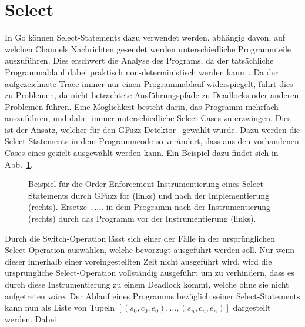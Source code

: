 \section{Select}
In Go können Select-Statements dazu verwendet werden, abhängig davon, 
auf welchen Channels Nachrichten gesendet werden unterschiedliche Programmteile
auszuführen. Dies erschwert die Analyse des Programs, da der 
tatsächliche Programmablauf dabei praktisch non-deterministisch werden 
kann~\cite{select-spec}. Da der aufgezeichnete Trace immer nur einen 
Programmablauf widerspiegelt, führt dies zu Problemen, da 
nicht betrachtete Ausführungspfade zu Deadlocks oder anderen Problemen 
führen. Eine Möglichkeit besteht darin, das Programm mehrfach auszuführen, 
und dabei immer unterschiedliche Select-Cases zu erzwingen. Dies ist der Ansatz,
welcher für den GFuzz-Detektor~\cite{gfuzz} gewählt wurde. Dazu werden die 
Select-Statements in dem Programmcode so verändert, dass aus den vorhandenen 
Cases eines gezielt ausgewählt werden kann. Ein Beispiel dazu findet sich 
in Abb.~\ref{Chap:Analyze-Sec:Channel-SubSec:Select-Fig:GFuzz_Inst}.
\begin{figure}[h!]
  \begin{minipage}[t]{0.3\textwidth}
    
  \end{minipage}
  \begin{minipage}[t]{0.65\textwidth}
    
  \end{minipage}
  \caption{Beispiel für die Order-Enforcement-Instrumentierung eines Select-Statements 
  durch GFuzz for (links) und nach der Implementierung (rechts). Ersetze $......$
  in dem Programm nach der Instrumentierung (rechts) durch das Programm vor der 
  Instrumentierung (links).~\cite[gekürzt]{gfuzz}}
  \label{Chap:Analyze-Sec:Channel-SubSec:Select-Fig:GFuzz_Inst}
\end{figure}
Durch die Switch-Operation lässt sich einer der Fälle in der ursprünglichen 
Select-Operation auswählen, welche bevorzugt ausgeführt werden soll. Nur 
wenn dieser innerhalb einer voreingestellten Zeit nicht ausgeführt wird, 
wird die ursprüngliche Select-Operation vollständig ausgeführt um zu verhindern, 
dass es durch diese Instrumentierung zu einem Deadlock kommt, welche ohne 
sie nicht aufgetreten wäre. Der Ablauf eines Programms bezüglich seiner 
Select-Statements kann nun als Liste von Tupeln 
$[(s_0, c_0, e_0), \ldots, (s_n, c_n, e_n)]$ dargestellt werden. Dabei 
